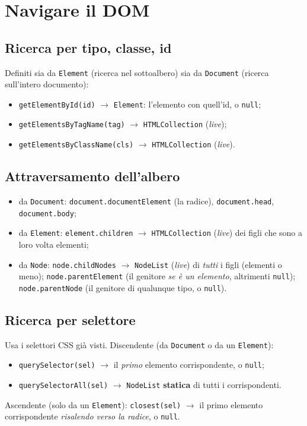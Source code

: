 \section{Navigare il DOM}

\subsection{Ricerca per tipo, classe, id}
Definiti sia da \texttt{Element} (ricerca nel sottoalbero) sia da \texttt{Document} (ricerca
sull'intero documento):
\begin{itemize}
  \item \texttt{getElementById(id)} $\rightarrow$ \texttt{Element}: l'elemento con quell'id,
        o \texttt{null};
  \item \texttt{getElementsByTagName(tag)} $\rightarrow$ \texttt{HTMLCollection}
        (\emph{live});
  \item \texttt{getElementsByClassName(cls)} $\rightarrow$ \texttt{HTMLCollection}
        (\emph{live}).
\end{itemize}

\subsection{Attraversamento dell'albero}
\begin{itemize}
  \item da \texttt{Document}: \texttt{document.documentElement} (la radice),
        \texttt{document.head}, \texttt{document.body};
  \item da \texttt{Element}: \texttt{element.children} $\rightarrow$
        \texttt{HTMLCollection} (\emph{live}) dei figli che sono a loro volta elementi;
  \item da \texttt{Node}: \texttt{node.childNodes} $\rightarrow$ \texttt{NodeList}
        (\emph{live}) di \emph{tutti} i figli (elementi o meno);
        \texttt{node.parentElement} (il genitore \emph{se \`e un elemento}, altrimenti
        \texttt{null}); \texttt{node.parentNode} (il genitore di qualunque tipo, o
        \texttt{null}).
\end{itemize}

\subsection{Ricerca per selettore}
Usa i selettori CSS gi\`a visti. Discendente (da \texttt{Document} o da un \texttt{Element}):
\begin{itemize}
  \item \texttt{querySelector(sel)} $\rightarrow$ il \emph{primo} elemento corrispondente, o
        \texttt{null};
  \item \texttt{querySelectorAll(sel)} $\rightarrow$ \texttt{NodeList} \textbf{statica} di
        tutti i corrispondenti.
\end{itemize}
Ascendente (solo da un \texttt{Element}): \texttt{closest(sel)} $\rightarrow$ il primo
elemento corrispondente \emph{risalendo verso la radice}, o \texttt{null}.

